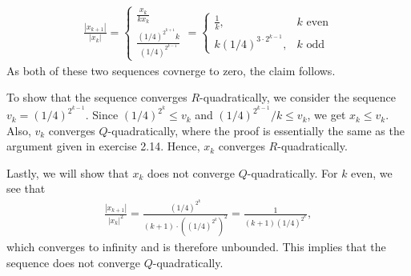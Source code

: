 \documentclass{article}
\begin{document}
\begin{align*}
\frac{|x_{k+1}|}{|x_{k}|}=\begin{cases}\frac{x_k}{kx_k}  \\
                                      \frac{\left(1/4\right)^{2^{k+1}}k}{(1/4)^{2^{k-1}}} \end{cases}=\begin{cases} \frac{1}{k}, &  k \textrm{ even} \\
              k(1/4)^{3\cdot 2^{k-1}},  &k  \textrm{ odd} \end{cases}
\end{align*}
As both of these two sequences covnerge to zero, the claim follows. \par
To show that the sequence converges $R$-quadratically, we consider the sequence
$v_k=(1/4)^{2^{k-1}}$. Since $(1/4)^{2^k}\leq v_k $ and $(1/4)^{2^{k-1}}/k\leq v_k$, we get
$x_k\leq v_k$. Also, $v_k$ converges $Q$-quadratically, where the proof is essentially the same
as the argument given in exercise 2.14. Hence, $x_k$ converges $R$-quadratically.\par
Lastly, we will show that $x_k$ does not converge $Q$-quadratically. For $k$ even, we see that
\begin{align*}
\frac{|x_{k+1}|}{|x_k|^2}=\frac{(1/4)^{2^k}}{(k+1)\cdot\left( (1/4)^{2^k} \right)^2}
=\frac{1}{(k+1)(1/4)^{2^k}},
\end{align*}
which converges to infinity and is therefore unbounded. This implies that the sequence does not converge $Q$-quadratically.
\end{document}
